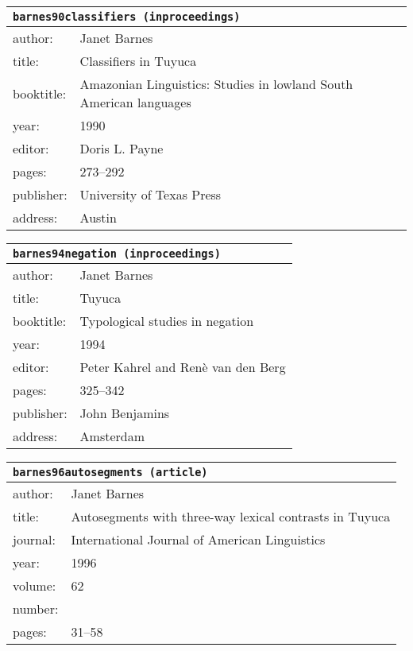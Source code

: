 \documentclass{article}
\begin{document}
\bigskip

\begin{tabular}{p{}p{}}
\multicolumn{2}{l}{\texttt{barnes90classifiers (inproceedings)}}\\
\hline
author: & Janet Barnes\\
title: & Classifiers in \textsc{T}uyuca\\
booktitle: & Amazonian Linguistics: Studies in lowland South American languages\\
year: & 1990\\
editor: & Doris L. Payne\\
pages: & 273--292\\
publisher: & University of Texas Press\\
address: & Austin\\
\end{tabular}

\bigskip

\begin{tabular}{p{}p{}}
\multicolumn{2}{l}{\texttt{barnes94negation (inproceedings)}}\\
\hline
author: & Janet Barnes\\
title: & Tuyuca\\
booktitle: & Typological studies in negation\\
year: & 1994\\
editor: & Peter Kahrel and Ren{\`e} {van den Berg}\\
pages: & 325--342\\
publisher: & John Benjamins\\
address: & Amsterdam\\
\end{tabular}

\bigskip

\begin{tabular}{p{}p{}}
\multicolumn{2}{l}{\texttt{barnes96autosegments (article)}}\\
\hline
author: & Janet Barnes\\
title: & Autosegments with three-way lexical contrasts in \textsc{T}uyuca\\
journal: & International Journal of American Linguistics\\
year: & 1996\\
volume: & 62\\
number: & \\
pages: & 31--58\\
\end{tabular}
\end{document}
